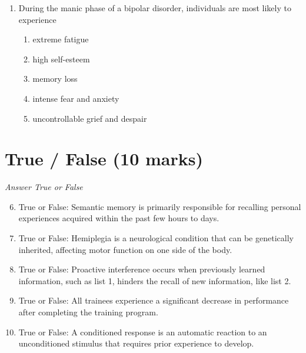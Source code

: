 \documentclass[12pt]{article}
\begin{document}
\begin{enumerate}[label=\arabic*.]
\begin{enumerate}[label=(\alph*)]
    \item Kendal's tau
    \item Biserial correlation
    \item Cramer's V
    \item Eta
    \item Goodman and Kruskal's gamma
\end{enumerate}
\item During the manic phase of a bipolar disorder, individuals are most likely to experience
\begin{enumerate}[label=(\alph*)]
    \item extreme fatigue
    \item high self-esteem
    \item memory loss
    \item intense fear and anxiety
    \item uncontrollable grief and despair
\end{enumerate}
\end{enumerate}

\section*{True / False (10 marks)}
\textit{Answer True or False}
\begin{enumerate}[label=\arabic*.]
\setcounter{enumi}{5}
\item True or False: Semantic memory is primarily responsible for recalling personal experiences acquired within the past few hours to days.
\item True or False: Hemiplegia is a neurological condition that can be genetically inherited, affecting motor function on one side of the body.
\item True or False: Proactive interference occurs when previously learned information, such as list 1, hinders the recall of new information, like list 2.
\item True or False: All trainees experience a significant decrease in performance after completing the training program.
\item True or False: A conditioned response is an automatic reaction to an unconditioned stimulus that requires prior experience to develop.
\end{enumerate}
\end{document}
